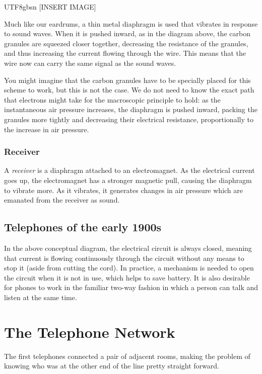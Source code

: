 \documentclass[UTF8]{book}
\begin{document}
\begin{CJK}{UTF8}{gbsn}
[INSERT IMAGE]

Much like our eardrums, a thin metal diaphragm is used that vibrates in response to sound waves. When it is pushed inward, as in the diagram above, the carbon granules are squeezed closer together, decreasing the resistance of the granules, and thus increasing the current flowing through the wire. This means that the wire now can carry the same signal as the sound waves.

You might imagine that the carbon granules have to be specially placed for this scheme to work, but this is not the case. We do not need to know the exact path that electrons might take for the macroscopic principle to hold: as the instantaneous air pressure increases, the diaphragm is pushed inward, packing the granules more tightly and decreasing their electrical resistance, proportionally to the increase in air pressure.

\subsection{Receiver}

A \emph{receiver} is a diaphragm attached to an electromagnet. As the electrical current goes up, the electromagnet has a stronger magnetic pull, causing the diaphragm to vibrate more. As it vibrates, it generates changes in air pressure which are emanated from the receiver as sound.

\section{Telephones of the early 1900s}

In the above conceptual diagram, the electrical circuit is always closed, meaning that current is flowing continuously through the circuit without any means to stop it (aside from cutting the cord). In practice, a mechanism is needed to open the circuit when it is not in use, which helps to save battery. It is also desirable for phones to work in the familiar two-way fashion in which a person can talk and listen at the same time.


\chapter{The Telephone Network}

The first telephones connected a pair of adjacent rooms, making the problem of knowing who was at the other end of the line pretty straight forward.


\end{CJK}
\end{document}
